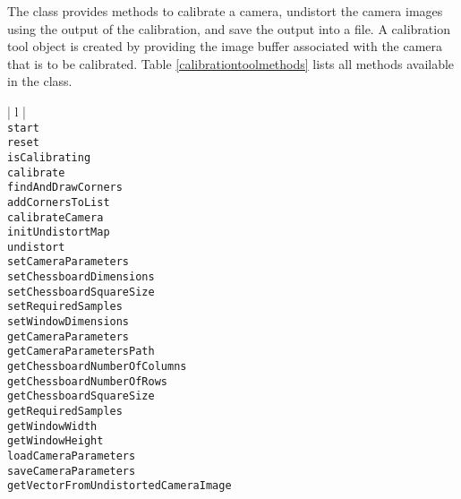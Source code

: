 The \CalibrationTool{} class provides methods to calibrate a camera, undistort the camera images using the 
output of the calibration, and save the output into a file. A calibration tool object is created by providing the 
image buffer associated with the camera that is to be calibrated. Table \ref{calibrationtoolmethods} lists 
all methods available in the \CalibrationTool{} class.

\begin{table}[ht]
\caption{Public methods in the \CalibrationTool{} class}
\begin{center}
\begin{tabular}{| l |}
	\hline 
	 \\
	\hline \hline
	\texttt{start} \\
	\texttt{reset} \\
	\texttt{isCalibrating} \\
	\texttt{calibrate} \\
	\texttt{findAndDrawCorners} \\
	\texttt{addCornersToList} \\
	\texttt{calibrateCamera} \\
	\texttt{initUndistortMap} \\
	\texttt{undistort} \\
	\texttt{setCameraParameters} \\
	\texttt{setChessboardDimensions} \\
	\texttt{setChessboardSquareSize} \\
	\texttt{setRequiredSamples} \\
	\texttt{setWindowDimensions} \\
	\texttt{getCameraParameters} \\
	\texttt{getCameraParametersPath} \\
	\texttt{getChessboardNumberOfColumns} \\
	\texttt{getChessboardNumberOfRows} \\
	\texttt{getChessboardSquareSize} \\
	\texttt{getRequiredSamples} \\
	\texttt{getWindowWidth} \\
	\texttt{getWindowHeight} \\
	\texttt{loadCameraParameters} \\
	\texttt{saveCameraParameters} \\ 
	\texttt{getVectorFromUndistortedCameraImage} \\
	\hline
\end{tabular}
\end{center}
\label{calibrationtoolmethods}
\end{table}

